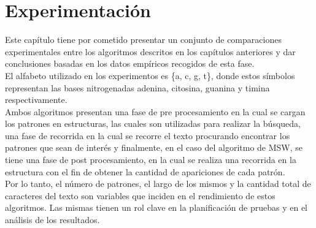 
\chapter{Experimentación} %

\label{Chapter4} %


Este capítulo tiene por cometido presentar un conjunto de comparaciones experimentales entre los algoritmos descritos en los capítulos anteriores y dar conclusiones basadas en los datos empíricos recogidos de esta fase.\\
El alfabeto utilizado en los experimentos es \{a, c, g, t\}, donde estos símbolos representan las bases nitrogenadas adenina, citosina, guanina y timina respectivamente.\\
Ambos algoritmos presentan una fase de pre procesamiento en la cual se cargan los patrones en estructuras, las cuales son utilizadas para realizar la búsqueda, una fase de recorrida en la cual se recorre el texto procurando encontrar los patrones que sean de interés y finalmente, en el caso del algoritmo de MSW, se tiene una fase de post procesamiento, en la cual se realiza una recorrida en la estructura con el fin de obtener la cantidad de apariciones de cada patrón.\\
Por lo tanto, el número de patrones, el largo de los mismos y la cantidad total de caracteres del texto son variables que inciden en el rendimiento de estos algoritmos. Las mismas tienen un rol clave en la planificación de pruebas y en el análisis de los resultados.
